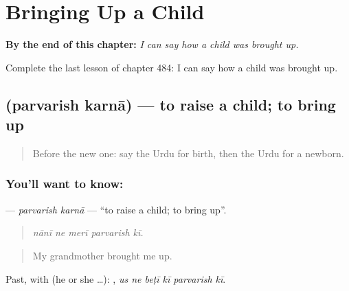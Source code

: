 
\chapter{Bringing Up a Child}
\label{ch:ur-bringing-up-a-child}

\begin{chapteropening}
\textbf{By the end of this chapter:} \emph{I can say how a child was brought up.}

Complete the last lesson of chapter 484: I can say how a child was brought up.
\end{chapteropening}

\section[\texorpdfstring{\ur{پرورش} \ur{کرنا} (parvarish karnā)}{پرورش کرنا (parvarish karnā)}]{  (parvarish karnā) — to raise a child; to bring up}

\label{lesson:UR-C484-parvarish-karna}



\begin{quote}
Before the new one: say the Urdu for birth, then the Urdu for a newborn.
\end{quote}

\subsection*{You'll want to know:  }
\textbf{ } — \emph{parvarish karnā} — \textquotedblleft{}to raise a child; to bring up\textquotedblright{}.

\begin{quote}
    
\end{quote}

\begin{quote}
\emph{nānī ne merī parvarish kī.}
\end{quote}

\begin{quote}
My grandmother brought me up.
\end{quote}

Past, with  (he or she …):      , \emph{us ne beṭī kī parvarish kī}.

